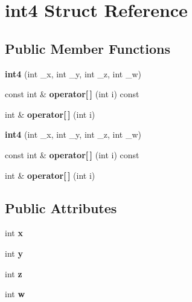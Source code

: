 \hypertarget{classint4}{}\section{int4 Struct Reference}
\label{classint4}
\subsection*{Public Member Functions}
\begin{DoxyCompactItemize}
\item 
\mbox{\label{classint4_a6efde3846ba0a56c7846728bdf246d1b}} 
{\bfseries int4} (int \+\_\+x, int \+\_\+y, int \+\_\+z, int \+\_\+w)
\item 
\mbox{\label{classint4_a53cfd00333e685ff4909ce4524c263e9}} 
const int \& {\bfseries operator\mbox{[}$\,$\mbox{]}} (int i) const
\item 
\mbox{\label{classint4_adbd1ea9ddcb011482aa4e1c6e58d34b1}} 
int \& {\bfseries operator\mbox{[}$\,$\mbox{]}} (int i)
\item 
\mbox{\label{classint4_a6efde3846ba0a56c7846728bdf246d1b}} 
{\bfseries int4} (int \+\_\+x, int \+\_\+y, int \+\_\+z, int \+\_\+w)
\item 
\mbox{\label{classint4_a53cfd00333e685ff4909ce4524c263e9}} 
const int \& {\bfseries operator\mbox{[}$\,$\mbox{]}} (int i) const
\item 
\mbox{\label{classint4_adbd1ea9ddcb011482aa4e1c6e58d34b1}} 
int \& {\bfseries operator\mbox{[}$\,$\mbox{]}} (int i)
\end{DoxyCompactItemize}
\subsection*{Public Attributes}
\begin{DoxyCompactItemize}
\item 
\mbox{\label{classint4_a5cf362aa802672cc8ef61fda401ea39f}} 
int {\bfseries x}
\item 
\mbox{\label{classint4_a7aa524da4f1f5a4615e958a009953495}} 
int {\bfseries y}
\item 
\mbox{\label{classint4_a95bb901cfcd69960cd3d609eef4c9c8c}} 
int {\bfseries z}
\item 
\mbox{\label{classint4_a5fcec5b3c04a5c1b6a5dc39e75d95975}} 
int {\bfseries w}
\end{DoxyCompactItemize}


